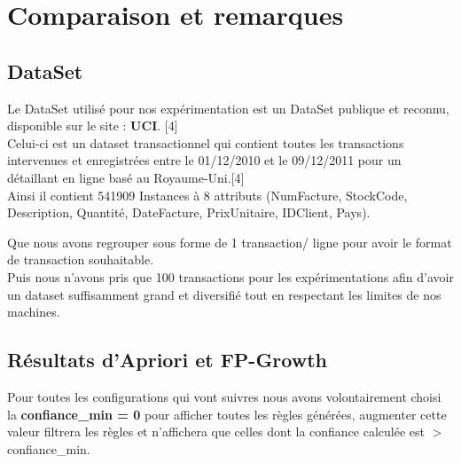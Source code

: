 \documentclass[12pt,a4paper,oneside]{book}
\begin{document}
	\newpage
	
	\section{Comparaison et remarques}
	\subsection{DataSet}
	Le DataSet utilisé pour nos expérimentation est un DataSet publique et reconnu, disponible sur le site : \textbf{UCI}. [4]\\
	Celui-ci est un dataset transactionnel qui contient toutes les transactions intervenues et enregistrées entre le 01/12/2010 et le 09/12/2011 pour un détaillant en ligne basé au Royaume-Uni.[4]\\
	
	Ainsi il contient 541909 Instances à 8 attributs (NumFacture, StockCode, Description, Quantité, DateFacture, PrixUnitaire, IDClient, Pays).
	
	
	Que nous avons regrouper sous forme de 1 transaction/ ligne pour avoir le format de transaction souhaitable.\\
	
	Puis nous n'avons pris que 100 transactions pour les expérimentations afin d'avoir un dataset suffisamment grand et diversifié tout en respectant les limites de nos machines. 
	\subsection{Résultats d'Apriori et FP-Growth} 
	Pour toutes les configurations qui vont suivres nous avons volontairement choisi la \textbf{confiance\_min = 0} pour afficher toutes les règles générées, augmenter cette valeur filtrera les règles et n'affichera que celles dont la confiance calculée est $>$ confiance\_min.
\end{document}
